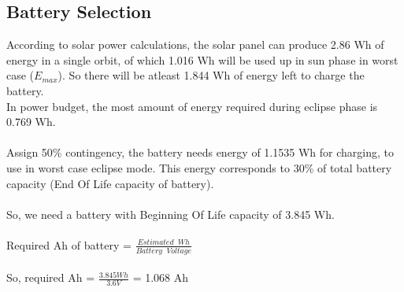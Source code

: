 \subsection{Battery Selection}
According to solar power calculations, the solar panel can produce 2.86 Wh of energy in a single orbit, of which 1.016 Wh will be used up in sun phase in worst case ($E_{max}$). So there will be atleast 1.844 Wh of energy left to charge the battery.\\
In power budget, the most amount of energy required during eclipse phase is 0.769 Wh.\\ \\
Assign 50\% contingency, the battery needs energy of 1.1535 Wh for charging, to use in worst case eclipse mode. This energy corresponds to 30\% of total battery capacity (End Of Life capacity of battery).\\ \\
So, we need a battery with Beginning Of Life capacity of 3.845 Wh.\\ \\
\hspace*{5cm}Required Ah of battery = $\frac{Estimated\;\; Wh}{Battery\;\; Voltage}$
\\ \\ \hspace*{5cm}So, required Ah = $\frac{3.845 Wh}{3.6 V}$ = 1.068 Ah\\


